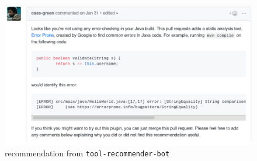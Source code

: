 \begin{figure}[H]
  \centering
  \includegraphics[width=\textwidth]{Appendix-A/images/tele.png}
  \caption{\TELE recommendation from \texttt{tool-recommender-bot}}
  \label{fig:telemarketer}
\end{figure}